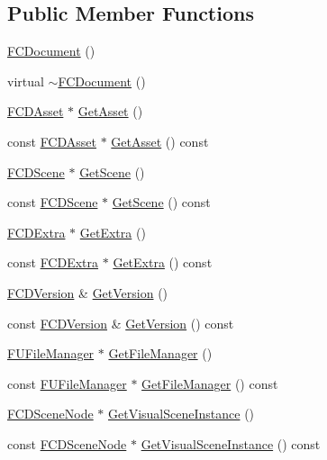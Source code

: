\subsection*{Public Member Functions}
\begin{DoxyCompactItemize}
\item 
\hyperlink{classFCDocument_a9769f1474665f8c2e794bba41e53b1e0}{FCDocument} ()
\item 
virtual \hyperlink{classFCDocument_aa4e159c889736ee056ba4e0b1763890b}{$\sim$FCDocument} ()
\item 
\hyperlink{classFCDAsset}{FCDAsset} $\ast$ \hyperlink{classFCDocument_a7bcebf9648d3cd1e0cd1ef797caa5a7c}{GetAsset} ()
\item 
const \hyperlink{classFCDAsset}{FCDAsset} $\ast$ \hyperlink{classFCDocument_a170b27aa27d0ac2570a5eecbc133d80b}{GetAsset} () const 
\item 
\hyperlink{classFCDScene}{FCDScene} $\ast$ \hyperlink{classFCDocument_ac4bc75901c66c568cbc7e23ed90534c7}{GetScene} ()
\item 
const \hyperlink{classFCDScene}{FCDScene} $\ast$ \hyperlink{classFCDocument_a34f31cfa9bdc2014bb619b8e65e4fc6b}{GetScene} () const 
\item 
\hyperlink{classFCDExtra}{FCDExtra} $\ast$ \hyperlink{classFCDocument_a7b3f1dcc00384c83f34ebd29ba7bace4}{GetExtra} ()
\item 
const \hyperlink{classFCDExtra}{FCDExtra} $\ast$ \hyperlink{classFCDocument_a0fc6701e531aecc66d860eccd781cbfc}{GetExtra} () const 
\item 
\hyperlink{classFCDVersion}{FCDVersion} \& \hyperlink{classFCDocument_a1710c45d89f59e40e9d53af2b304e936}{GetVersion} ()
\item 
const \hyperlink{classFCDVersion}{FCDVersion} \& \hyperlink{classFCDocument_ac8030b6edc5a51142bcbc845c6864d4b}{GetVersion} () const 
\item 
\hyperlink{classFUFileManager}{FUFileManager} $\ast$ \hyperlink{classFCDocument_a1d0a8cfe7e696e46c7b76bfe80ea3fc4}{GetFileManager} ()
\item 
const \hyperlink{classFUFileManager}{FUFileManager} $\ast$ \hyperlink{classFCDocument_a18ba25e6ff8b20da6f3aa244d95f13d9}{GetFileManager} () const 
\item 
\hyperlink{classFCDSceneNode}{FCDSceneNode} $\ast$ \hyperlink{classFCDocument_a020ea8de8371296000abfa5a70358017}{GetVisualSceneInstance} ()
\item 
const \hyperlink{classFCDSceneNode}{FCDSceneNode} $\ast$ \hyperlink{classFCDocument_adf95d427788c779dac15bb1d7a044c13}{GetVisualSceneInstance} () const 

\end{DoxyCompactItemize}
